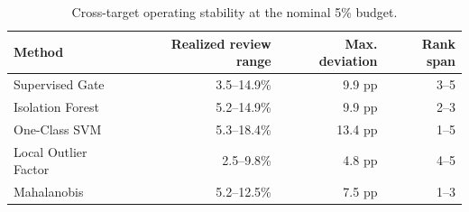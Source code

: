 \begin{table}[t]
\centering
\caption{Cross-target operating stability at the nominal 5\% budget.}
\label{tab:screening-stability}
\scriptsize
\begin{tabular}{lrrr}
\toprule
Method & Realized review range & Max. deviation & Rank span \\ 
\midrule
Supervised Gate & 3.5--14.9\% & 9.9 pp & 3--5 \\
Isolation Forest & 5.2--14.9\% & 9.9 pp & 2--3 \\
One-Class SVM & 5.3--18.4\% & 13.4 pp & 1--5 \\
Local Outlier Factor & 2.5--9.8\% & 4.8 pp & 4--5 \\
Mahalanobis & 5.2--12.5\% & 7.5 pp & 1--3 \\
\bottomrule
\end{tabular}
\end{table}
